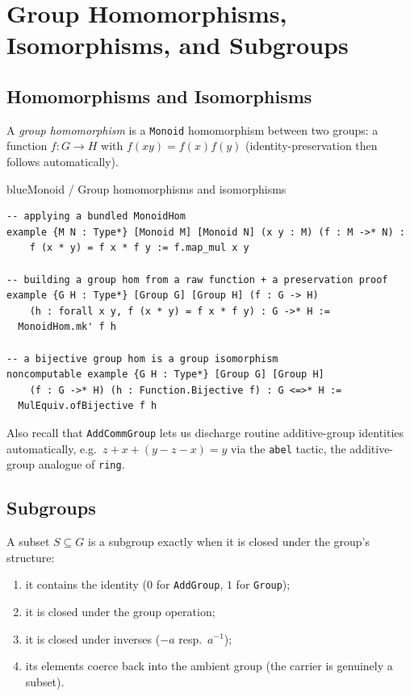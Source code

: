 \documentclass[11pt]{article}
\begin{document}
\section{Group Homomorphisms, Isomorphisms, and Subgroups}

\subsection{Homomorphisms and Isomorphisms}

A \emph{group homomorphism} is a \texttt{Monoid} homomorphism between two groups: a function $f:G\to H$ with $f(xy)=f(x)f(y)$ (identity-preservation then follows automatically).

\begin{defbox}{blue}{Monoid / Group homomorphisms and isomorphisms}
\begin{lstlisting}
-- applying a bundled MonoidHom
example {M N : Type*} [Monoid M] [Monoid N] (x y : M) (f : M ->* N) :
    f (x * y) = f x * f y := f.map_mul x y

-- building a group hom from a raw function + a preservation proof
example {G H : Type*} [Group G] [Group H] (f : G -> H)
    (h : forall x y, f (x * y) = f x * f y) : G ->* H :=
  MonoidHom.mk' f h

-- a bijective group hom is a group isomorphism
noncomputable example {G H : Type*} [Group G] [Group H]
    (f : G ->* H) (h : Function.Bijective f) : G <=>* H :=
  MulEquiv.ofBijective f h
\end{lstlisting}
\end{defbox}

Also recall that \texttt{AddCommGroup} lets us discharge routine additive-group identities automatically, e.g.\ $z+x+(y-z-x)=y$ via the \verb|abel| tactic, the additive-group analogue of \verb|ring|.

\subsection{Subgroups}

A subset $S\subseteq G$ is a subgroup exactly when it is closed under the group's structure:
\begin{enumerate}[leftmargin=1.6em,itemsep=1pt]
  \item it contains the identity ($0$ for \texttt{AddGroup}, $1$ for \texttt{Group});
  \item it is closed under the group operation;
  \item it is closed under inverses ($-a$ resp.\ $a^{-1}$);
  \item its elements coerce back into the ambient group (the carrier is genuinely a subset).
\end{enumerate}
\end{document}
